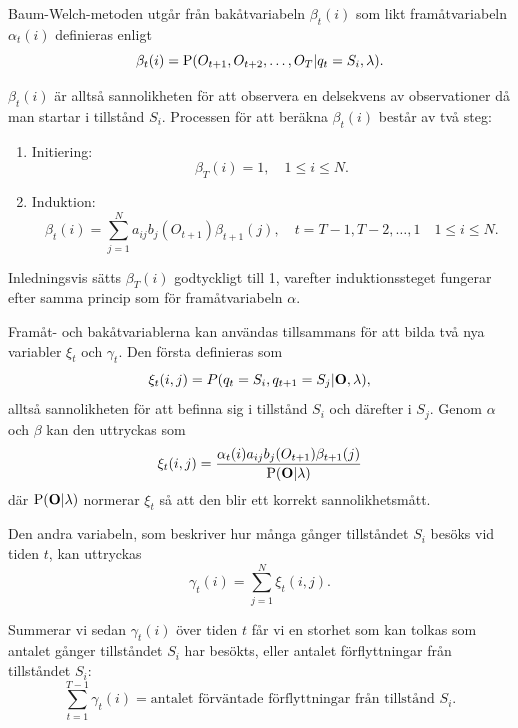 \documentclass[../rapport_MVEX01-11-05]{subfiles}
\begin{document}
Baum-Welch-metoden utgår från bakåtvariabeln $\beta_t(i)$ som likt
framåtvariabeln $\alpha_t(i)$ definieras enligt
\begin{equation*}
\beta_t(i) = \mathrm{P}(O_{t+1},O_{t+2},\dots,O_T | q_t = S_i, \lambda).
\end{equation*} 

$\beta_t(i)$ är alltså sannolikheten för att observera en delsekvens av
observationer då man startar i tillstånd $S_i$. Processen för att beräkna $\beta_t(i)$ består av två steg:
\begin{enumerate}
\item Initiering: 
\begin{equation*}
\beta_T(i) = 1, \quad 1 \leq i \leq N.
\end{equation*}
\item Induktion: 
\begin{equation*}
\beta_t(i) = \sum\limits_{j=1}^Na_{ij}b_j(O_{t+1})\beta_{t+1}(j), \quad t =
T-1,T-2,\dots,1 \quad 1 \leq i \leq N.
\end{equation*}
\end{enumerate}

Inledningsvis sätts $\beta_T(i)$ godtyckligt till 1, varefter
induktionssteget fungerar efter samma princip som för framåtvariabeln
$\alpha$.

Framåt- och bakåtvariablerna kan användas tillsammans
för att bilda två nya variabler $\xi_t$ och $\gamma_t$.
Den första definieras som 
\begin{equation*}
\xi_t(i,j) = P(q_t = S_i, q_{t+1} = S_j|\mathbf{O},\lambda),
\end{equation*}
alltså sannolikheten för att befinna sig i tillstånd $S_i$ och
därefter i $S_j$. Genom $\alpha$ och $\beta$ kan den uttryckas som
\begin{equation*}
\xi_t(i,j) = \frac{\alpha_t(i)a_{ij}b_j(O_{t+1})\beta_{t+1}(j)}{\mathrm{P}(\mathbf{O}|\lambda)}
\end{equation*} 
där $\mathrm{P}(\mathbf{O}|\lambda)$ normerar $\xi_t$ så att den blir ett korrekt
sannolikhetsmått.

Den andra variabeln, som beskriver hur många gånger tillståndet $S_i$ besöks
vid tiden $t$, kan uttryckas
\begin{equation*}
\gamma_t(i) = \sum_{j=1}^N\xi_t(i,j).
\end{equation*}

Summerar vi sedan $\gamma_t(i)$ över tiden $t$ får vi en storhet
som kan tolkas som antalet gånger tillståndet $S_i$ har besökts,
eller antalet förflyttningar från tillståndet $S_i$:
\begin{equation*}
\sum_{t=1}^{T-1}\gamma_t(i) = \text{antalet förväntade förflyttningar
  från tillstånd $S_i$.}
\end{equation*} 
\end{document}
